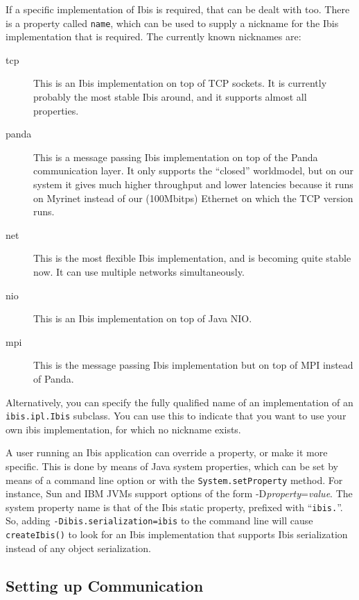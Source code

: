 \documentclass[10pt]{article}
\newcommand{\remark}[1]{[\emph{#1}]}
\begin{document}
\noindent
If a specific implementation of Ibis is required, that can be dealt with too.
There is a property called \texttt{name}, which can be used to supply a nickname
for the Ibis implementation that is required.
The currently known nicknames are:
\begin{description}
\item[tcp]
This is an Ibis implementation on top of TCP sockets. It is currently 
probably the most stable Ibis around, and it supports almost all properties.
\item[panda]
This is a message passing Ibis implementation on top of the Panda
communication layer. It only supports the ``closed'' worldmodel,
but on our system it gives much higher throughput and lower latencies
because it runs on Myrinet instead of our (100Mbitps) Ethernet on which
the TCP version runs.
\item[net]
This is the most flexible Ibis implementation, and is becoming quite
stable now. It can use multiple networks simultaneously.
\item[nio]
This is an Ibis implementation on top of Java NIO.
\item[mpi]
This is the message passing Ibis implementation but on top of MPI instead
of Panda. 
\end{description}

\noindent
Alternatively, you can specify the fully qualified name of an
implementation of an \texttt{ibis.ipl.Ibis} subclass. You can use this
to indicate that you want to use your own ibis implementation, for which no nickname exists.

A user running an Ibis application can override a property, or make
it more specific. This is done by means of Java system properties,
which can be set by means of a command line option or with the
\texttt{System.setProperty} method.
For instance, Sun and IBM JVMs support options of the form
-D\emph{property}=\emph{value}.  The system property name is that
of the Ibis static property, prefixed with ``\texttt{ibis.}''.  So,
adding \texttt{-Dibis.serialization=ibis} to the command line will cause
\texttt{createIbis()} to look for an Ibis implementation
that supports Ibis serialization instead of any object serialization.

\subsection{Setting up Communication}
\end{document}
